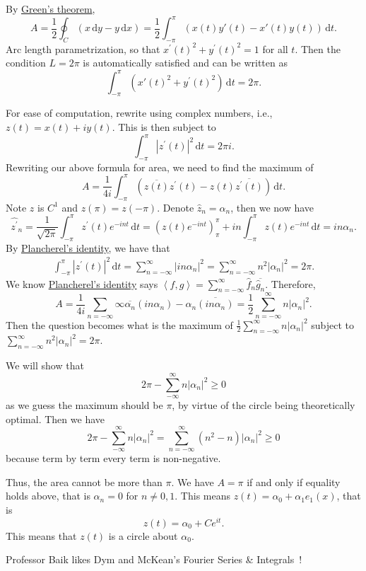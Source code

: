 \begin{explanation}
	By \href{https://en.wikipedia.org/wiki/Green's_theorem}{Green's theorem},
	\[
		A = \frac{1}{2} \oint_C (x \,\mathrm{d}y - y \,\mathrm{d}x) = \frac{1}{2} \int_{-\pi}^\pi (x(t)y'(t) - x'(t)y(t)) \,\mathrm{d}t.
	\]
	Arc length parametrization, so that \(x^\prime (t)^2 + y^\prime (t)^2 = 1\) for all \(t\). Then the condition \(L = 2 \pi\) is automatically satisfied and can be written as
	\[
		\int_{-\pi}^\pi (x'(t)^2 + y^\prime(t)^2) \,\mathrm{d}t = 2\pi.
	\]

	For ease of computation, rewrite using complex numbers, i.e., \(z(t) = x(t) + i y(t)\). This is then subject to
	\[
		\int_{-\pi}^\pi \left\vert z^\prime(t) \right\vert^2 \,\mathrm{d}t = 2 \pi i.
	\]
	Rewriting our above formula for area, we need to find the maximum of
	\[
		A = \frac{1}{4i}\int_{-\pi}^\pi (\overline{z(t)}z^\prime(t) - z(t)\overline{z^\prime(t)}) \,\mathrm{d}t.
	\]
	Note \(z\) is \(C^1\) and \(z(\pi) = z(-\pi)\). Denote \(\hat{z}_n = \alpha_n\), then we now have
	\[
		\widehat{z^\prime}_n
		= \frac{1}{\sqrt{2\pi} } \int_{-\pi}^\pi z^\prime(t) e^{-in t} \,\mathrm{d}t
		= \left(z(t)e^{-i n t}\right)^\pi_\pi + in\int_{-\pi}^\pi z(t) e^{-in t} \,\mathrm{d}t
		= in\alpha_n.
	\]
	By \hyperref[eg:Plancherel-identity]{Plancherel's identity}, we have that
	\begin{align*}
		\int_{-\pi}^\pi \left\vert z^\prime (t) \right\vert ^2 \,\mathrm{d}t
		= \sum_{n=-\infty}^\infty \left\vert in\alpha_n \right\vert ^2
		= \sum_{n=-\infty}^\infty n^2 \left\vert \alpha_n \right\vert ^2 = 2\pi.
	\end{align*}
	We know \hyperref[eg:Plancherel-identity]{Plancherel's identity} says \(\left< f,g \right> = \sum_{n=-\infty}^\infty \hat{f}_n\overline{\hat{g}_n}\). Therefore,
	\[
		A = \frac{1}{4i} \sum_{n=-\infty}\infty \overline{\alpha_n}(in\alpha_n) - \alpha_n\overline{(in\alpha_n)}
		= \frac{1}{2} \sum_{n=-\infty}^\infty n \left\vert \alpha_n \right\vert ^2.
	\]
	Then the question becomes what is the maximum of \(\frac{1}{2}\sum_{n=-\infty}^\infty n\left\vert \alpha_n \right\vert^2\) subject to \(\sum_{n=-\infty}^\infty n^2\left\vert \alpha_n \right\vert^2 = 2\pi\).

	We will show that
	\[
		2 \pi - \sum_{-\infty}^\infty n\left\vert \alpha_n \right\vert^2 \geq 0
	\]
	as we guess the maximum should be \(\pi\), by virtue of the circle being theoretically optimal. Then we have
	\[
		2 \pi - \sum_{-\infty}^\infty n\left\vert \alpha_n \right\vert^2 = \sum_{n=-\infty}^\infty (n^2-n)\left\vert \alpha_n \right\vert^2 \geq 0
	\]
	because term by term every term is non-negative.

	Thus, the area cannot be more than \(\pi\). We have \(A = \pi\) if and only if equality holds above, that is \(\alpha_n = 0\) for \(n \neq 0,1\). This means \(z(t) = \alpha_0 + \alpha_1 e_1(x)\), that is
	\[
		z(t) = \alpha_0 + Ce^{it}.
	\]
	This means that \(z(t)\) is a circle about \(\alpha_0\).
\end{explanation}

\begin{note}
	Professor Baik likes Dym and McKean's Fourier Series \& Integrals~\cite{dym1972fourier}!
\end{note}